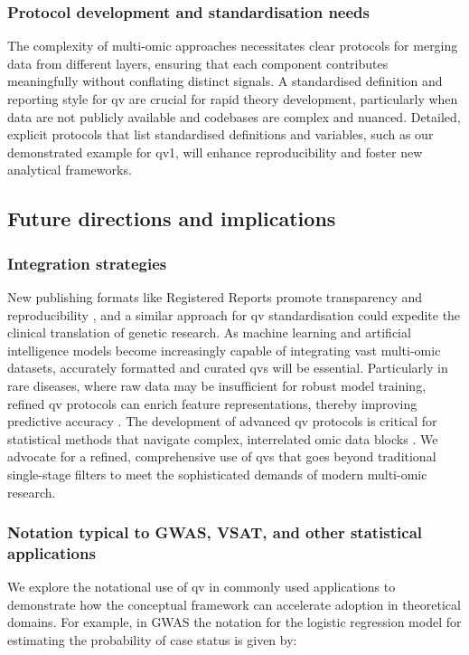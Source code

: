 \subsubsection{Protocol development and standardisation needs} 
The complexity of multi-omic approaches necessitates clear protocols for merging data from different layers, ensuring that each component contributes meaningfully without conflating distinct signals. A standardised definition and reporting style for \ac{qv} are crucial for rapid theory development, particularly when data are not publicly available and codebases are complex and nuanced. Detailed, explicit protocols that list standardised definitions and variables, such as our demonstrated example for \ac{qv}1, will enhance reproducibility and foster new analytical frameworks.


\subsection{Future directions and implications} 
\subsubsection{Integration strategies}

New publishing formats like Registered Reports promote transparency and reproducibility \cite{chambers2014instead}, and a similar approach for \ac{qv} standardisation could expedite the clinical translation of genetic research. As machine learning and artificial intelligence models become increasingly capable of integrating vast multi-omic datasets, accurately formatted and curated \ac{qv}s will be essential. Particularly in rare diseases, where raw data may be insufficient for robust model training, refined \ac{qv} protocols can enrich feature representations, thereby improving predictive accuracy
\cite{barto2020looking}. 
The development of advanced \ac{qv} protocols is critical for statistical methods that navigate complex, interrelated omic data blocks \cite{smilde_multiblock_2022}. We advocate for a refined, comprehensive use of \ac{qv}s that goes beyond traditional single-stage filters to meet the sophisticated demands of modern multi-omic research.

\subsubsection{Notation typical to GWAS, VSAT, and other statistical applications}
We explore the notational use of \ac{qv} in commonly used applications to demonstrate how the conceptual framework can accelerate adoption in theoretical domains. 
For example, in GWAS \cite{uffelmann2021genome} the notation for the logistic regression model for estimating the probability of case status is given by:

